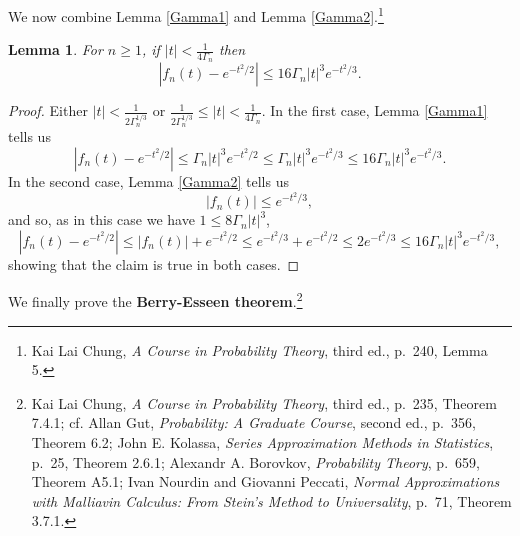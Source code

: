 \documentclass{article}
\newtheorem{lemma}[theorem]{Lemma}
\theoremstyle{definition}
\begin{document}
We now combine Lemma \ref{Gamma1} and Lemma \ref{Gamma2}.\footnote{Kai Lai Chung,
{\em A Course in Probability Theory}, third ed., p.~240, Lemma 5.}

\begin{lemma}
For $n \geq 1$, if $|t| < \frac{1}{4\Gamma_n}$ then
\[
|f_n(t) - e^{-t^2/2}| \leq 16 \Gamma_n |t|^3 e^{-t^2/3}.
\]
\label{Gamma3}
\end{lemma}
\begin{proof}
Either $|t|<\frac{1}{2\Gamma_n^{1/3}}$ or $\frac{1}{2\Gamma_n^{1/3}} \leq |t| < \frac{1}{4\Gamma_n}$. 
In the first case, Lemma \ref{Gamma1} tells us
\[
|f_n(t)-e^{-t^2/2}| \leq \Gamma_n |t|^3 e^{-t^2/2} \leq  \Gamma_n |t|^3 e^{-t^2/3}
\leq  16 \Gamma_n |t|^3 e^{-t^2/3}.
\]
In the second case, 
Lemma \ref{Gamma2} tells us
\[
|f_n(t)| \leq e^{-t^2/3},
\]
and so, as in this case we have $1 \leq 8\Gamma_n |t|^3$, 
\[
|f_n(t) - e^{-t^2/2}| \leq 
|f_n(t)| + e^{-t^2/2} \leq e^{-t^2/3} + e^{-t^2/2} \leq 2e^{-t^2/3}
\leq 16 \Gamma_n |t|^3 e^{-t^2/3},
\]
showing that the claim is true in both cases.
\end{proof}




We finally prove the \textbf{Berry-Esseen theorem}.\footnote{Kai Lai Chung,
{\em A Course in Probability Theory}, third ed., p.~235, Theorem 7.4.1; cf. Allan Gut, {\em Probability: A Graduate Course}, second ed., p.~356, Theorem 6.2;
John E. Kolassa, {\em Series Approximation Methods in Statistics}, p.~25, Theorem 2.6.1;
Alexandr A. Borovkov, {\em Probability Theory}, p.~659, Theorem A5.1;
Ivan Nourdin and Giovanni Peccati, {\em Normal Approximations with Malliavin Calculus: From Stein's Method to Universality}, p.~71, Theorem 3.7.1.}
\end{document}
